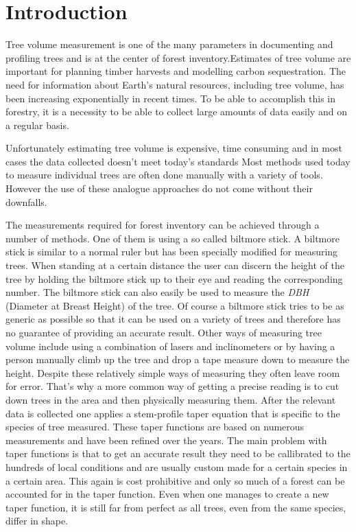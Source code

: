 

\newcommand{\degree}{$^\circ$}

\section{Introduction}
Tree volume measurement is one of the many parameters in documenting and profiling trees and is at the center of forest inventory.Estimates of tree volume are important for planning timber harvests and modelling carbon sequestration. The need for information about Earth's natural resources, including tree volume, has been increasing exponentially in recent times. To be able to accomplish this in forestry, it is a necessity to be able to collect large amounts of data easily and on a regular basis. 

Unfortunately estimating tree volume is expensive, time consuming and in most cases the data collected doesn't meet today's standards \cite{digital imaged based tree measurement for forest inventory}
Most methods used today to measure individual trees are often done manually with a variety of tools. However the use of these analogue approaches do not come without their downfalls.

The measurements required for forest inventory can be achieved through a number of methods. One of them is using a so called biltmore stick. A biltmore stick is similar to a normal ruler but has been specially modified for measuring trees. When standing at a certain distance the user can discern the height of the tree by holding the biltmore stick up to their eye and reading the corresponding number. The biltmore stick can also easily be used to measure the \emph{DBH} (Diameter at Breast Height) of the tree. Of course a biltmore stick tries to be as generic as possible so that it can be used on a variety of trees and therefore has no guarantee of providing an accurate result. Other ways of measuring tree volume include using a combination of lasers and inclinometers or by having a person manually climb up the tree and drop a tape measure down to measure the height. Despite these relatively simple ways of measuring they often leave room for error. That’s why a more common way of getting a precise reading is to cut down trees in the area and then physically measuring them. After the relevant data is collected one applies a stem-profile taper equation that is specific to the species of tree measured. These taper functions are based on numerous measurements and have been refined over the years. The main problem with taper functions is that to get an accurate result they need to be callibrated to the hundreds of local conditions and are usually custom made for a certain species in a certain area. This again is cost prohibitive and only so much of a forest can be accounted for in the taper function. Even when one manages to create a new taper function, it is still far from perfect as all trees, even from the same species, differ in shape.

